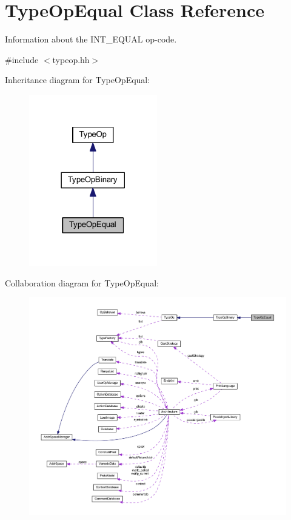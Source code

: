 \hypertarget{class_type_op_equal}{}\section{Type\+Op\+Equal Class Reference}
\label{class_type_op_equal}


Information about the I\+N\+T\+\_\+\+E\+Q\+U\+AL op-\/code.  




{\ttfamily \#include $<$typeop.\+hh$>$}



Inheritance diagram for Type\+Op\+Equal\+:
\nopagebreak
\begin{figure}[H]
\begin{center}
\leavevmode
\includegraphics[width=158pt]{class_type_op_equal__inherit__graph}
\end{center}
\end{figure}


Collaboration diagram for Type\+Op\+Equal\+:
\nopagebreak
\begin{figure}[H]
\begin{center}
\leavevmode
\includegraphics[width=350pt]{class_type_op_equal__coll__graph}
\end{center}
\end{figure}
